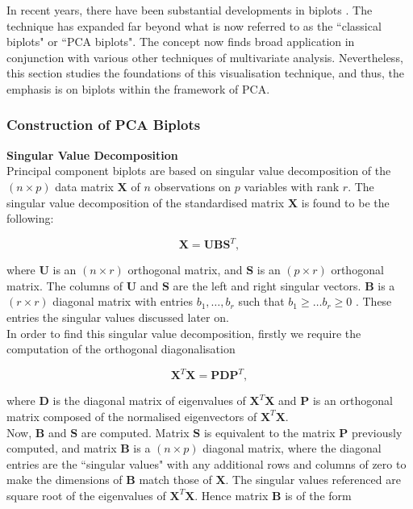\documentclass{article}\usepackage[]{graphicx}\usepackage[]{xcolor}
\numberwithin{equation}{section}
\begin{document}
\noindent In recent years, there have been substantial developments in biplots \cite{gower1995biplots}. The technique has expanded far beyond what is now referred to as the ``classical biplots" or ``PCA biplots". The concept now finds broad application in conjunction with various other techniques of multivariate analysis. Nevertheless, this section studies the foundations of this visualisation technique, and thus, the emphasis is on biplots within the framework of PCA.

\subsubsection{Construction of PCA Biplots}

\noindent \textbf{Singular Value Decomposition}\\
\noindent Principal component biplots are based on singular value decomposition of the $(n \times p)$ data matrix $\mathbf{X}$ of $n$ observations on $p$ variables with rank $r$. The singular value decomposition of the standardised matrix $\mathbf{X}$ is found to be the following:

\[\mathbf{X} = \mathbf{U}\mathbf{B}\mathbf{S}^{T}, \]

\noindent where $\mathbf{U}$ is an $(n \times r)$ orthogonal matrix, and $\mathbf{S}$ is an $(p \times r)$ orthogonal matrix. The columns of $\mathbf{U}$ and $\mathbf{S}$ are the left and right singular vectors. $\mathbf{B}$ is a $(r \times r)$ diagonal matrix with entries $b_1, \ldots, b_r$ such that $b_1 \geq \dots b_r \geq 0$ \cite{jolliffe2003principal}. These entries the singular values discussed later on.\\

\noindent In order to find this singular value decomposition, firstly we require the computation of the orthogonal diagonalisation  

\[
\mathbf{X}^T\mathbf{X}=\mathbf{PDP}^T,
\] 

\noindent where $\mathbf{D}$ is the diagonal matrix of eigenvalues of $\mathbf{X}^T\mathbf{X}$ and $\mathbf{P}$ is an orthogonal matrix composed of the normalised eigenvectors of $\mathbf{X}^T\mathbf{X}$.\\

\noindent Now, $\mathbf{B}$ and $\mathbf{S}$ are computed. Matrix $\mathbf{S}$ is equivalent to the matrix $\mathbf{P}$ previously computed, and matrix $\mathbf{B}$ is a $(n \times p)$ diagonal matrix, where the diagonal entries are the ``singular values" with any additional rows and columns of zero to make the dimensions of $\mathbf{B}$ match those of $\mathbf{X}$. The singular values referenced are square root of the eigenvalues of $\mathbf{X}^T\mathbf{X}$. Hence matrix $\mathbf{B}$ is of the form
\end{document}
